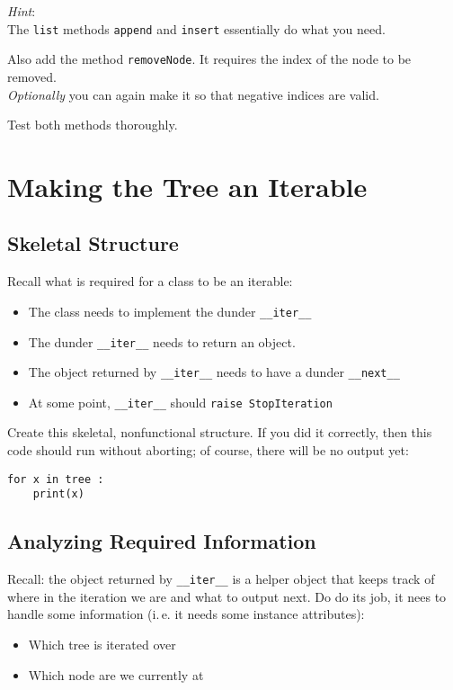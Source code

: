 \documentclass[
	english,
	fontsize=10pt,
	parskip=half,
	titlepage=true,
	DIV=12
]{scrartcl}
\newcommand*{\inPy}[1]{\texttt{#1}}
\newcommand*{\ie}{i.\,e.\xspace}
\begin{document}
\emph{Hint}:\\
The \inPy{list} methods \texttt{append} and \texttt{insert} essentially do what you need.

Also add the method \texttt{removeNode}. It requires the index of the node to be removed.\\
\emph{Optionally} you can again make it so that negative indices are valid.

Test both methods thoroughly.

\section{Making the Tree an Iterable}
\subsection{Skeletal Structure}
Recall what is required for a class to be an iterable:
\begin{itemize}
\item The class needs to implement the dunder \inPy{__iter__}
\item The dunder \inPy{__iter__} needs to return an object.
\item The object returned by \inPy{__iter__} needs to have a dunder \inPy{__next__}
\item At some point, \inPy{__iter__} should \inPy{raise StopIteration}
\end{itemize}

Create this skeletal, nonfunctional structure. If you did it correctly, then this code should run without aborting; of course, there will be no output yet:
\begin{verbatim}
for x in tree :
    print(x)
\end{verbatim}

\subsection{Analyzing Required Information}
Recall: the object returned by \inPy{__iter__} is a helper object that keeps track of where in the iteration we are and what to output next. Do do its job, it nees to handle some information (\ie it needs some instance attributes):
\begin{itemize}
\item Which tree is iterated over
\item Which node are we currently at
\end{itemize}
\end{document}

